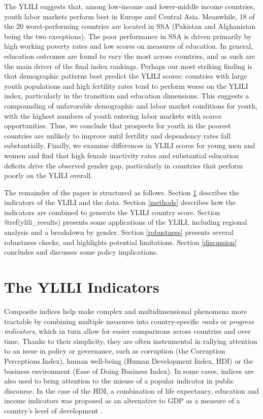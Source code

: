 \documentclass[
  a4paper, twoside, 12pt]{book}
\begin{document}
The YLILI suggests that, among low-income and lower-middle income countries, youth labor markets perform best in Europe and Central Asia. Meanwhile, 18 of the 20 worst-performing countries are located in SSA (Pakistan and Afghanistan being the two exceptions). The poor performance in SSA is driven primarily by high working poverty rates and low scores on measures of education. In general, education outcomes are found to vary the most across countries, and as such are the main driver of the final index rankings. Perhaps our most striking finding is that demographic patterns best predict the YLILI scores: countries with large youth populations and high fertility rates tend to perform worse on the YLILI index, particularly in the transition and education dimensions. This suggests a compounding of unfavorable demographic and labor market conditions for youth, with the highest numbers of youth entering labor markets with scarce opportunities. Thus, we conclude that prospects for youth in the poorest countries are unlikely to improve until fertility and dependency rates fall substantially. Finally, we examine differences in YLILI scores for young men and women and find that high female inactivity rates and substantial education deficits drive the observed gender gap, particularly in countries that perform poorly on the YLILI overall.

The remainder of the paper is structured as follows. Section \ref{indicators} describes the indicators of the YLILI and the data. Section \ref{methods} describes how the indicators are combined to generate the YLILI country score. Section @ref(ylili\_results) presents some applications of the YLILI, including regional analysis and a breakdown by gender. Section \ref{robustness} presents several robustness checks, and highlights potential limitations. Section \ref{discussion} concludes and discusses some policy implications.

\hypertarget{indicators}{%
\section{The YLILI Indicators}\label{indicators}}

Composite indices help make complex and multidimensional phenomena more tractable by combining multiple measures into country-specific \emph{ranks} or \emph{progress indicators}, which in turn allow for easier comparisons across countries and over time. Thanks to their simplicity, they are often instrumental in rallying attention to an issue in policy or governance, such as corruption (the Corruption Perceptions Index), human well-being (Human Development Index, HDI) or the business environment (Ease of Doing Business Index). In some cases, indices are also used to bring attention to the misuse of a popular indicator in public discourse. In the case of the HDI, a combination of life expectancy, education and income indicators was proposed as an alternative to GDP as a measure of a country's level of development \autocite{undp1990}.
\end{document}
